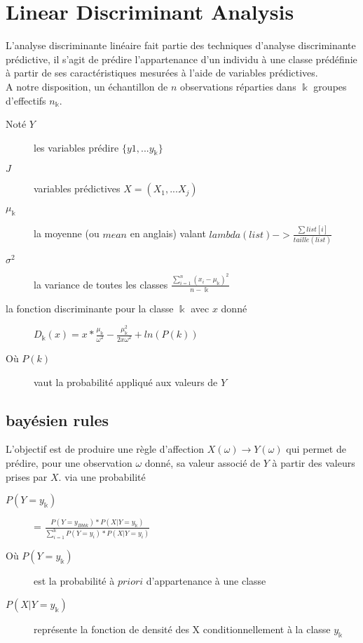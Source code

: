 \section{Linear Discriminant Analysis}
L'analyse discriminante linéaire fait partie des techniques d'analyse discriminante prédictive, il s'agit de prédire l'appartenance d'un individu à une classe prédéfinie à partir de ses caractéristiques mesurées à l'aide de variables prédictives.\\
A notre disposition, un échantillon de $n$ observations réparties dans $\Bbbk$ groupes d'effectifs $n_{\Bbbk}$.\\
\begin{description}
\item[Noté $Y$] les variables prédire $\{y1, ... y_{\Bbbk}\}$
\item[$J$] variables prédictives $X = (X_1, ... X_j)$
\item[$\mu_{\Bbbk}$] la moyenne (ou $\textit{mean}$ en anglais) valant $lambda(list) -> \frac{\sum list[i]}{taille(list)}$
\item[$\sigma^2$] la variance de toutes les classes $\frac{\sum_{i=1}^n (x_i - \mu_{\Bbbk})^2}{n - \Bbbk}$
\item[la fonction discriminante pour la classe $\Bbbk$ avec $x$ donné] $D_{\Bbbk} (x) = x * \frac{\mu_{\Bbbk}}{\omega^2} - \frac{\mu_{\Bbbk}^2}{2x\omega^2} + ln(P(k))$
\item[Où $P(k)$] vaut la probabilité appliqué aux valeurs de $Y$
\end{description}

\subsection{bayésien rules}
L'objectif est de produire une règle d'affection $X(\omega) \rightarrow Y(\omega)$ qui permet de prédire, pour une observation $\omega$ donné, sa valeur associé de $Y$ à partir des valeurs prises par $X$. via une probabilité\\
\begin{description}
\item[$P(Y=y_{\Bbbk})$] = $\frac{P(Y=y_{Bbbk})*P(X|Y=y_{\Bbbk})}{\sum_{i=1}^{\Bbbk} P(Y=y_i)*P(X|Y=y_i)}$
\item[Où $P(Y=y_{\Bbbk})$] est la probabilité à $priori$ d'appartenance à une classe
\item[$P(X|Y=y_{\Bbbk})$] représente la fonction de densité des X conditionnellement à la classe $y_{\Bbbk}$
\end{description}

